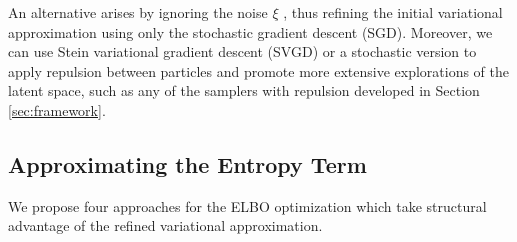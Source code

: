 An alternative arises by ignoring the noise $\xi$ \parencite{mandt2017stochastic}, thus refining the initial variational approximation using only the stochastic gradient descent (SGD).
 Moreover, we can use Stein variational gradient descent (SVGD) \parencite{liu2016stein} or a stochastic version \parencite{gallego2018stochastic} to apply repulsion between particles and promote more extensive explorations of the latent space, such as any of the samplers with repulsion developed in Section \ref{sec:framework}.

\subsection*{Approximating the Entropy Term}\label{sec:approx}

We propose four approaches for the ELBO optimization 
which take structural advantage of the refined variational approximation.

